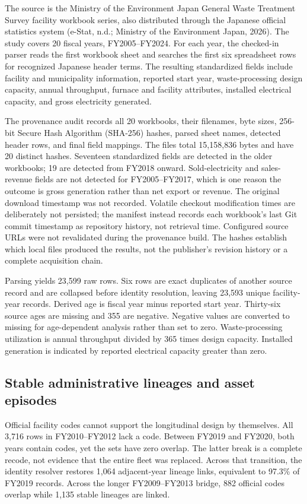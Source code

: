\documentclass[11pt,letterpaper]{article}
\begin{document}
The source is the Ministry of the Environment Japan General Waste Treatment
Survey facility workbook series, also distributed through the Japanese official
statistics system (e-Stat, n.d.; Ministry of the Environment Japan, 2026). The
study covers 20 fiscal years, FY2005--FY2024. For each year, the checked-in parser
reads the first workbook sheet and searches the first six spreadsheet rows for
recognized Japanese header terms. The resulting standardized fields include
facility and municipality information, reported start year, waste-processing
design capacity, annual throughput, furnace and facility attributes, installed
electrical capacity, and gross electricity generated.

The provenance audit records all 20 workbooks, their filenames, byte sizes,
256-bit Secure Hash Algorithm (SHA-256) hashes, parsed sheet names, detected
header rows, and final field
mappings. The files total 15,158,836 bytes and have 20 distinct hashes.
Seventeen standardized fields are detected in the older workbooks; 19 are
detected from FY2018 onward. Sold-electricity and sales-revenue fields are not
detected for FY2005--FY2017, which is one reason the outcome is gross generation
rather than net export or revenue. The original download timestamp was not
recorded. Volatile checkout modification times are deliberately not persisted;
the manifest instead records each workbook's last Git commit timestamp as
repository history, not retrieval time. Configured source URLs were not
revalidated during the provenance build. The hashes establish which local
files produced the results, not the publisher's revision history or a complete
acquisition chain.

Parsing yields 23,599 raw rows. Six rows are exact duplicates of another source
record and are collapsed before identity resolution, leaving 23,593 unique
facility-year records. Derived age is fiscal year minus reported start year.
Thirty-six source ages are missing and 355 are negative. Negative values are
converted to missing for age-dependent analysis rather than set to zero.
Waste-processing utilization is annual throughput divided by 365 times design
capacity. Installed generation is indicated by reported electrical capacity
greater than zero.

\subsection{Stable administrative lineages and asset episodes}

Official facility codes cannot support the longitudinal design by themselves.
All 3,716 rows in FY2010--FY2012 lack a code. Between FY2019 and FY2020, both
years contain codes, yet the sets have zero overlap. The latter break is a
complete recode, not evidence that the entire fleet was replaced. Across that
transition, the identity resolver restores 1,064 adjacent-year lineage links,
equivalent to 97.3\% of FY2019 records. Across the longer FY2009--FY2013 bridge,
882 official codes overlap while 1,135 stable lineages are linked.
\end{document}
